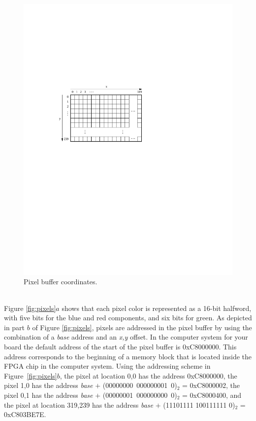 \documentclass[epsfig,10pt,fullpage]{article}
\begin{document}
\begin{figure}[h!]
   \begin{center}
       \includegraphics{figures/fig_video_coord.pdf}
   \end{center}
   \caption{Pixel buffer coordinates.}
	\label{fig:video_coord}
\end{figure}

~\\
\noindent
Figure \ref{fig:pixels}$a$ shows that each pixel color is represented as a 16-bit halfword, 
with five bits for the blue and red components, and six bits for green.  As depicted in 
part $b$ of Figure \ref{fig:pixels}, pixels are addressed in the pixel buffer by 
using the combination of a {\it base} address and an {\it x,y} offset. In the computer 
system for your board the default address of the start of the pixel buffer is {\sf 0xC8000000}.
This address corresponds to the beginning of a memory block that is located inside the FPGA
chip in the computer system. Using the addressing scheme in Figure~\ref{fig:pixels}$b$, 
the pixel at location 0,0 has the address {\sf 0xC8000000}, 
the pixel 1,0 has the address {\it base} $+$ (00000000~000000001~0)$_2$ = {\sf 0xC8000002}, 
the pixel 0,1 has the address {\it base} $+$ (00000001~000000000~0)$_2$ = {\sf 0xC8000400}, and 
the pixel at location 319,239 has the address {\it base} $+$ (11101111 100111111 0)$_2$ = 
{\sf 0xC803BE7E}. 
\end{document}

